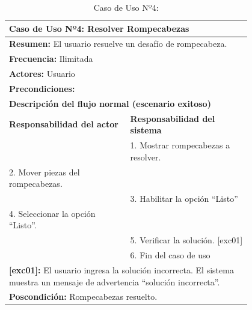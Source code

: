 \begin{table}[H]
    \centering
    \caption{Caso de Uso Nº4: }
    
    \begin{tabular}{| p{0.4\linewidth} | p{0.4\linewidth} |}
        \hline
        \multicolumn{2}{|l|}{\textbf{Caso de Uso Nº4:} Resolver Rompecabezas} \\
        \hline
        \multicolumn{2}{|l|}{\textbf{Resumen:} El usuario resuelve un desafío de rompecabeza.} \\
        \hline
        \multicolumn{2}{|l|}{\textbf{Frecuencia:} Ilimitada} \\
        \hline
        \multicolumn{2}{|l|}{\textbf{Actores:} Usuario} \\
        \hline
        \multicolumn{2}{|l|}{\textbf{Precondiciones:}} \\
        \hline
        \multicolumn{2}{|l|}{\textbf{Descripción del flujo normal (escenario exitoso)} } \\
        \hline
        \textbf{Responsabilidad del actor} & \textbf{Responsabilidad del sistema} \\
        & 1. Mostrar rompecabezas a resolver. \\
        2. Mover piezas del rompecabezas. \\
        & 3. Habilitar la opción “Listo” \\
        4. Seleccionar la opción “Listo”. \\
        & 5. Verificar la solución. [exc01] \\
        & 6. Fin del caso de uso \\
        \hline
        \multicolumn{2}{|p{0.8\linewidth}|}{\textbf{[exc01]:} El usuario ingresa la solución incorrecta. El sistema muestra un mensaje de advertencia “solución incorrecta”.} \\
        \hline
        \multicolumn{2}{|l|}{\textbf{Poscondición:} Rompecabezas resuelto.} \\
        \hline
    \end{tabular}

    \label{table:4}
\end{table}


